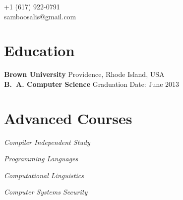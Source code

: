 \documentclass[margin,line]{resume}
\begin{document}
\begin{resume}

    \hfill +1 (617) 922-0791         \vspace{0mm}\\\vspace{0mm}%
    \hfill samboosalis@gmail.com     \vspace{0mm}\\\vspace{-4.5mm}%

    \section{\mysidestyle{} Education}

    \textbf{Brown University}    \hfill Providence, Rhode Island, USA     \vspace{2mm}\\
    \textbf{B.\ A. Computer Science}  \hfill Graduation Date: June 2013 \vspace{-3mm}\\\vspace{-1.5mm}%

    \section{\mysidestyle{} Advanced Courses}

    \textsl{Compiler Independent Study}   \par\vspace{-4mm}%
     {\addtolength{\leftskip}{2 mm} 
      \par}
 
     \textsl{Programming Languages} \par\vspace{-4mm}%
    {\addtolength{\leftskip}{2 mm} 
    \par}
    
    \textsl{Computational Linguistics} \par\vspace{-4mm}%
     {\addtolength{\leftskip}{2 mm} 
         \par}
     
    \textsl{Computer Systems Security} \par\vspace{-4mm}%
    {\addtolength{\leftskip}{2 mm} 
    \par}
    

\end{resume}
\end{document}
